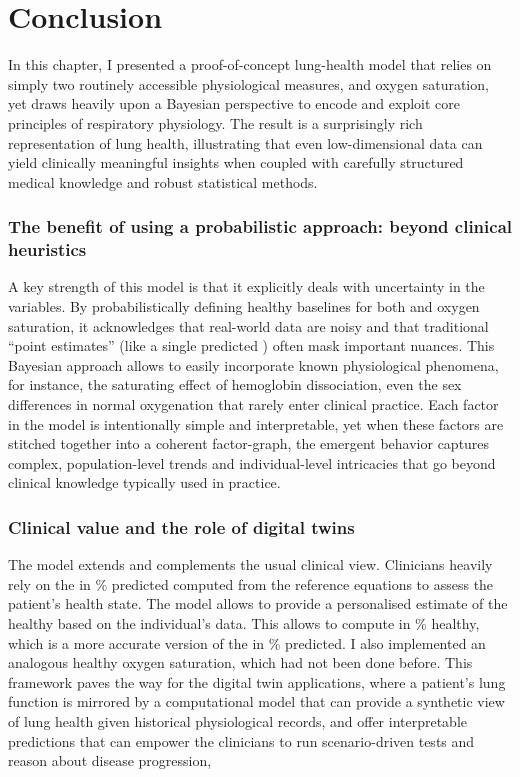 

\section{Conclusion}

In this chapter, I presented a proof-of-concept lung-health model that relies on simply two routinely accessible physiological measures, \F and oxygen saturation, yet draws heavily upon a Bayesian perspective to encode and exploit core principles of respiratory physiology. The result is a surprisingly rich representation of lung health, illustrating that even low-dimensional data can yield clinically meaningful insights when coupled with carefully structured medical knowledge and robust statistical methods.

\subsubsection{The benefit of using a probabilistic approach: beyond clinical heuristics}
A key strength of this model is that it explicitly deals with uncertainty in the variables. By probabilistically defining healthy baselines for both \F and oxygen saturation, it acknowledges that real-world data are noisy and that traditional “point estimates” (like a single predicted \F) often mask important nuances. This Bayesian approach allows to easily incorporate known physiological phenomena, for instance, the saturating effect of hemoglobin dissociation, even the sex differences in normal oxygenation that rarely enter clinical practice. Each factor in the model is intentionally simple and interpretable, yet when these factors are stitched together into a coherent factor-graph, the emergent behavior captures complex, population-level trends and individual-level intricacies that go beyond clinical knowledge typically used in practice.

\subsubsection{Clinical value and the role of digital twins}
The model extends and complements the usual clinical view. Clinicians heavily rely on the \F in \% predicted computed from the reference equations to assess the patient's health state. The model allows to provide a personalised estimate of the healthy \F based on the individual's data. This allows to compute \F in \% healthy, which is a more accurate version of the \F in \% predicted. I also implemented an analogous healthy oxygen saturation, which had not been done before. This framework paves the way for the digital twin applications, where a patient’s lung function is mirrored by a computational model that can provide a synthetic view of lung health given historical physiological records, and offer interpretable predictions that can empower the clinicians to run scenario-driven tests and reason about disease progression,

